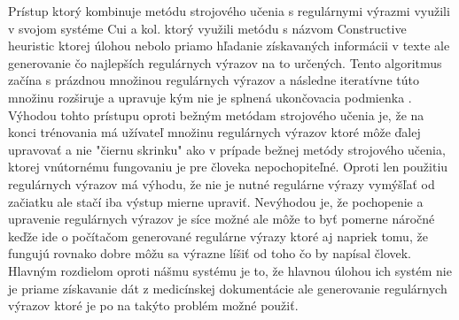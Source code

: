 Prístup ktorý kombinuje metódu strojového učenia 
s regulárnymi výrazmi využili v svojom systéme
Cui a kol. \cite{CHA} ktorý využili metódu s názvom 
Constructive heuristic ktorej úlohou nebolo
priamo hľadanie získavaných informácii v texte ale
generovanie čo najlepších regulárnych výrazov
na to určených. Tento algoritmus začína s
prázdnou množinou regulárnych výrazov a 
následne iteratívne túto množinu rozširuje
a upravuje kým nie je splnená ukončovacia
podmienka \cite{conHeu}. Výhodou tohto prístupu oproti
bežným metódam strojového učenia je, 
že na konci trénovania má užívateľ množinu
regulárnych výrazov ktoré môže ďalej upravovať
a nie "čiernu skrinku" ako v prípade bežnej metódy strojového
učenia, ktorej vnútornému fungovaniu je pre človeka
nepochopiteľné. Oproti len použitiu regulárnych výrazov
má výhodu, že nie je nutné regulárne výrazy vymýšľať
od začiatku ale stačí iba výstup mierne upraviť.
Nevýhodou je, že pochopenie a upravenie regulárnych
výrazov je síce možné ale môže to byť pomerne náročné
keďže ide o počítačom generované regulárne výrazy
ktoré aj napriek tomu, že fungujú rovnako dobre môžu
sa výrazne líšiť od toho čo by napísal človek.  
Hlavným rozdielom oproti nášmu systému je to, 
že hlavnou úlohou ich systém nie je priame získavanie
dát z medicínskej dokumentácie ale generovanie 
regulárnych výrazov ktoré je po na takýto problém
možné použiť.

